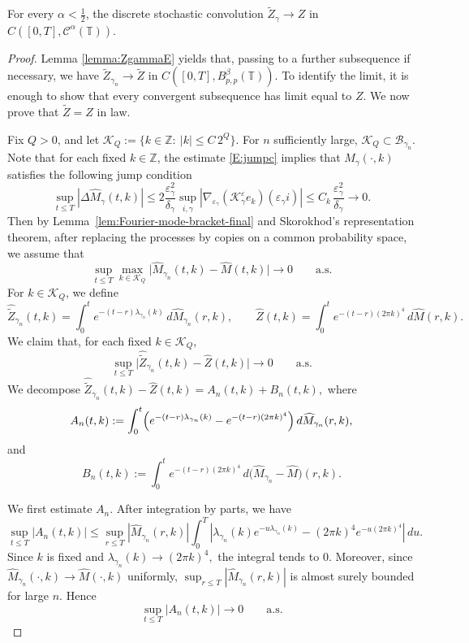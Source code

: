 \documentclass[10pt,a4paper]{amsart}
\begin{document}
\begin{theorem}
\label{thm:Zgamma-final}
For every \(\alpha<\frac12\), the discrete stochastic convolution
\(\widetilde Z_\gamma\rightarrow Z\) in \(C([0,T],\mathcal C^\alpha(\mathbb T)).\)
\end{theorem}

\begin{proof}
Lemma \ref{lemma:ZgammaE} yields that, passing to a further subsequence if necessary, we have
\(
\widetilde Z_{\gamma_n}\rightarrow \widetilde Z \)
in $C([0,T],B^\beta_{p,p}(\mathbb T))$.
To identify the limit, it is enough to show that every convergent subsequence has limit equal to \(Z\).
We now prove that \(\widetilde Z=Z\) in law.

Fix \(Q > 0\), and let
\(
\mathcal K_Q:=\{k\in\mathbb Z:\ |k|\le C\,2^Q\}.
\)
For \(n\) sufficiently large, \(\mathcal K_Q\subset \mathcal B_{\gamma_n}\).
Note that for each fixed \(k\in\mathbb Z\), the estimate \eqref{E:jumpc} implies that $M_\gamma(\cdot,k)$ satisfies the following jump condition
\[
\sup_{t\le T}|\Delta \widehat M_\gamma(t,k)| \le 2\frac{\varepsilon_\gamma^2}{\delta_\gamma} \sup_{i,\gamma}|\nabla_{\varepsilon_\gamma}(\mathcal K_\gamma^\varepsilon e_k)(\varepsilon_\gamma i)|
\le
C_k\,\frac{\varepsilon_\gamma^2}{\delta_\gamma} \to 0.
\]
Then by Lemma~\ref{lem:Fourier-mode-bracket-final} and Skorokhod's representation theorem, after replacing the processes by copies on a common probability space,
we assume that
\[
\sup_{t\le T}
\max_{k\in\mathcal K_Q}
\bigl|
\widehat M_{\gamma_n}(t,k)-\widehat M(t,k)
\bigr|
\longrightarrow0
\qquad\text{a.s.}
\]
For \(k\in\mathcal K_Q\), we define
\[
\widehat{\widetilde Z}_{\gamma_n}(t,k)
=
\int_0^t e^{-(t-r)\lambda_{\gamma_n}(k)}\,d\widehat M_{\gamma_n}(r,k),
\qquad
\widehat Z(t,k)
=
\int_0^t e^{-(t-r)(2\pi k)^4}\,d\widehat M(r,k).
\]
We claim that, for each fixed \(k\in\mathcal K_Q\),
\[
\sup_{t\le T}
\bigl|
\widehat{\widetilde Z}_{\gamma_n}(t,k)-\widehat Z(t,k)
\bigr|
\rightarrow0
\qquad\text{a.s.}
\]
We decompose
\(
\widehat{\widetilde Z}_{\gamma_n}(t,k)-\widehat Z(t,k)
=
A_n(t,k)+B_n(t,k),
\)
where
\[
A_n(t,k)
:=
\int_0^t
\Bigl(
e^{-(t-r)\lambda_{\gamma_n}(k)}
-
e^{-(t-r)(2\pi k)^4}
\Bigr)\,d\widehat M_{\gamma_n}(r,k),
\]
and
\[
B_n(t,k)
:=
\int_0^t e^{-(t-r)(2\pi k)^4}\,d\bigl(\widehat M_{\gamma_n}-\widehat M\bigr)(r,k).
\]

We first estimate \(A_n\). After integration by parts, we have
\[
\sup_{t\le T}|A_n(t,k)|
\le
\sup_{r\le T}|\widehat M_{\gamma_n}(r,k)|
\int_0^T
\left|
\lambda_{\gamma_n}(k)e^{-u\lambda_{\gamma_n}(k)}
-(2\pi k)^4e^{-u(2\pi k)^4}
\right|\,du.
\]
Since \(k\) is fixed and \(
\lambda_{\gamma_n}(k)\longrightarrow (2\pi k)^4,
\)
the integral tends to \(0\). Moreover, since \(\widehat M_{\gamma_n}(\cdot,k)\to \widehat M(\cdot,k)\) uniformly,
\(
\sup_{r\le T}|\widehat M_{\gamma_n}(r,k)|
\)
is almost surely bounded for large \(n\).
Hence
\[
\sup_{t\le T}|A_n(t,k)|\longrightarrow0
\qquad\text{a.s.}
\]


\end{proof}
\end{document}
